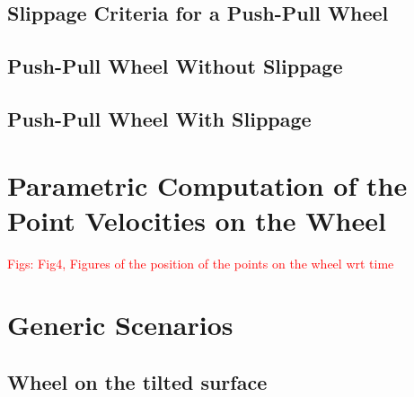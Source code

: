 \documentclass[letterpaper, 10pt, conference]{ieeeconf}
\begin{document}
\subsection{Slippage Criteria for a Push-Pull Wheel} \label{SlipCri-PW}
\subsection{Push-Pull Wheel Without Slippage}
\subsection{Push-Pull Wheel With Slippage}


\section{Parametric Computation of the Point Velocities on the Wheel}
\textcolor{red}{Figs: Fig4, Figures of the position of the points on the wheel wrt time}
\section{Generic Scenarios}
\subsection{Wheel on the tilted surface}
\end{document}
